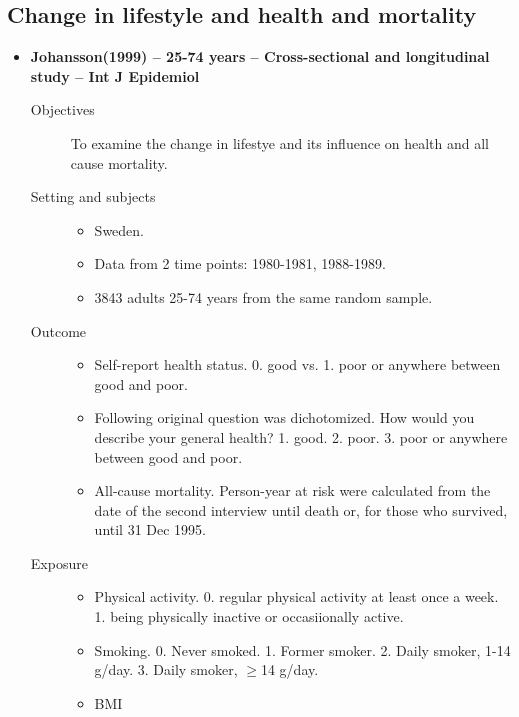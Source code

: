 \documentclass{article}
\begin{document}
\subsection{Change in lifestyle and health and mortality}
\begin{itemize}
	\item{\bf Johansson(1999) -- 25-74 years -- Cross-sectional and longitudinal study -- Int J Epidemiol} 
		\begin{description}
			\item[Objectives]\mbox{}\par
				To examine the change in lifestye and its influence on health and all cause mortality.
			\item[Setting and subjects]\mbox{}\par 
				\begin{itemize}
					\item Sweden. 
					\item Data from 2 time points: 1980-1981, 1988-1989.
					\item 3843 adults 25-74 years from the same random sample.
				\end{itemize}
			\item[Outcome]\mbox{}\par
				\begin{itemize}
					\item Self-report health status. 0. good vs. 1. poor or anywhere between good and poor.
					\item Following original question was dichotomized. How would you describe your general health? 1. good. 2. poor. 3. poor or anywhere between good and poor.
					\item All-cause mortality. Person-year at risk were calculated from the date of the second interview until death or, for those who survived, until 31 Dec 1995.
				\end{itemize}
			\item[Exposure] \mbox{}\par
				\begin{itemize}
					\item Physical activity. 0. regular physical  activity at least once a week. 1. being physically inactive or occasiionally active. 
					\item Smoking. 0. Never smoked. 1. Former smoker. 2. Daily smoker, 1-14 g/day. 3. Daily smoker, $\ge$14 g/day.
					\item BMI

\end{itemize}
\end{description}
\end{itemize}
\end{document}
